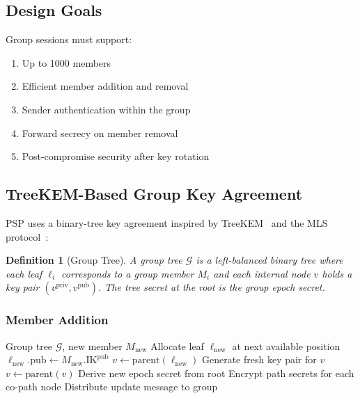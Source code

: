 \documentclass[11pt,a4paper]{article}
\newtheorem{definition}{Definition}[section]
\begin{document}
\subsection{Design Goals}

Group sessions must support:

\begin{enumerate}
    \item Up to 1000 members
    \item Efficient member addition and removal
    \item Sender authentication within the group
    \item Forward secrecy on member removal
    \item Post-compromise security after key rotation
\end{enumerate}

\subsection{TreeKEM-Based Group Key Agreement}

PSP uses a binary-tree key agreement inspired by
TreeKEM~\cite{barnes2020treekem} and the MLS
protocol~\cite{barnes2023mls}:

\begin{definition}[Group Tree]
    A group tree $\mathcal{G}$ is a left-balanced binary tree where each
    leaf $\ell_i$ corresponds to a group member $M_i$ and each internal
    node $v$ holds a key pair $(v^{\mathrm{priv}}, v^{\mathrm{pub}})$.
    The tree secret at the root is the group epoch secret.
\end{definition}

\subsubsection{Member Addition}

\begin{algorithm}[H]
\caption{Add Member to Group}
\label{alg:group-add}
\begin{algorithmic}[1]
\Require Group tree $\mathcal{G}$, new member $M_{\mathrm{new}}$
\State Allocate leaf $\ell_{\mathrm{new}}$ at next available position
\State $\ell_{\mathrm{new}}.\mathrm{pub} \gets
    M_{\mathrm{new}}.\mathrm{IK}^{\mathrm{pub}}$
\State $v \gets \mathrm{parent}(\ell_{\mathrm{new}})$
    \State Generate fresh key pair for $v$
    \State $v \gets \mathrm{parent}(v)$
\EndWhile
\State Derive new epoch secret from root
\State Encrypt path secrets for each co-path node
\State Distribute update message to group
\end{algorithmic}
\end{algorithm}
\end{document}
